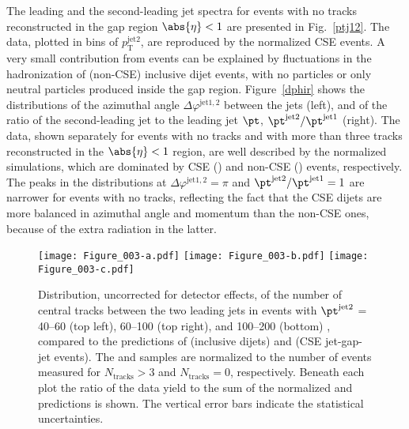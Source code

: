 \documentclass[11pt,twoside,a4paper,cmspaper,final,collab]{cms-tdr}
\begin{document}
The leading and the second-leading jet \pt spectra for events with no tracks reconstructed in the gap region $\abs{\eta}<1$ are presented in Fig.~\ref{ptj12}. The data, plotted in bins of $p^\text{jet2}_\mathrm{T}$, are reproduced by the normalized  CSE events. A very small contribution from  events can be explained by fluctuations in the hadronization of (non-CSE) inclusive dijet events, with no particles or only neutral particles produced inside the gap region. Figure~\ref{dphir} shows the distributions of the azimuthal angle $\Delta \varphi^\mathrm{jet1,2}$ between the jets (left), and of the ratio of the second-leading jet \pt to the leading jet $\pt$, $\pt^\text{jet2}/\pt^\mathrm{jet1}$ (right). The data, shown separately for events with no tracks and with more than three tracks reconstructed in the $\abs{\eta}<1$ region, are well described by the normalized simulations, which are dominated by CSE () and non-CSE () events, respectively. The peaks in the distributions at $\Delta \varphi^\mathrm{jet1,2}=\pi$ and  $\pt^\text{jet2}/\pt^\mathrm{jet1}=1$ are narrower for events with no tracks, reflecting the fact that the CSE dijets are more balanced in azimuthal angle and momentum than the non-CSE ones, because of the extra radiation in the latter.


\begin{figure*}
\centering
\texttt{[image: Figure\_003-a.pdf]}
\texttt{[image: Figure\_003-b.pdf]}
\texttt{[image: Figure\_003-c.pdf]}
\caption{Distribution, uncorrected for detector effects, of the number of central tracks between the two leading jets in events with $\pt^\text{jet2}$ = 40--60 (top left), 60--100 (top right), and 100--200 (bottom) \GeV, compared to the predictions of  (inclusive dijets) and  (CSE jet-gap-jet events). The  and  samples are normalized to the number of events measured for $N_\text{tracks}>3$ and  $N_\text{tracks}=0$, respectively. Beneath each plot the ratio of the data yield to the sum of the normalized  and  predictions is shown. The vertical error bars indicate the statistical uncertainties.}
\label{ptmtpl}
\end{figure*}
\end{document}
